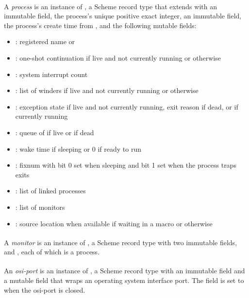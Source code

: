 \paragraph {}
A \emph{process} is an instance of , a Scheme record type
that extends  with an immutable  field, the process's
unique positive exact integer, an immutable  field,
the process's create time from , and the following
mutable fields:
\begin{itemize}
\item {}: registered name or 
\item {}: one-shot continuation if live and not currently
  running or  otherwise
\item {}: system interrupt count
\item {}: list of winders if live and not currently
  running or \code{()} otherwise
\item {}: exception state if live and not
  currently running, exit reason if dead, or  if currently
  running
\item {}: queue of  if live or  if
  dead
\item {}: wake time if sleeping or 0 if ready to run
\item {}: fixnum with bit 0 set when sleeping and bit 1
  set when the process traps exits
\item {}: list of linked processes
\item {}: list of monitors
\item {}: source location  when available if waiting in a 
  macro or  otherwise
\end{itemize}

\paragraph {}
A \emph{monitor} is an instance of , a Scheme record type
with two immutable fields,  and , each
of which is a process.

\paragraph {}
An \emph{osi-port} is an instance of , a Scheme
record type with an immutable  field and a mutable
 field that wraps an operating system interface
port. The  field is set to  when the
osi-port is closed.

